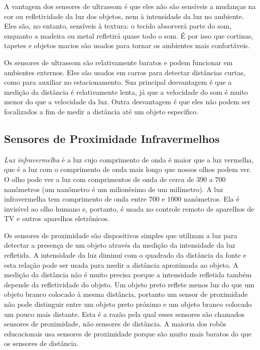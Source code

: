 A vantagem dos sensores de ultrassom é que eles não são sensíveis a mudanças na cor ou refletividade da luz dos objetos, nem à intensidade da luz no ambiente. Eles são, no entanto, sensíveis à textura: o tecido absorverá parte do som, enquanto a madeira ou metal refletirá quase todo o som. É por isso que cortinas, tapetes e objetos macios são usados para tornar os ambientes mais confortáveis.

Os sensores de ultrassom são relativamente baratos e podem funcionar em ambientes externos. Eles são usados em carros para detectar distâncias curtas, como para auxiliar no estacionamento. Sua principal desvantagem é que a medição da distância é relativamente lenta, já que a velocidade do som é muito menor do que a velocidade da luz. Outra desvantagem é que eles não podem ser focalizados a fim de medir a distância até um objeto específico.

\subsection{Sensores de Proximidade Infravermelhos}

\emph{Luz infravermelha} é a luz cujo comprimento de onda é maior que a luz vermelha, que é a luz com o comprimento de onda mais longo que nossos olhos podem ver. O olho pode ver a luz com comprimentos de onda de cerca de $390$ a $700$ nanômetros (um nanômetro é um milionésimo de um milímetro). A luz infravermelha tem comprimento de onda entre $700$ e $1000$ nanômetros. Ela é invisível ao olho humano e, portanto, é usada no controle remoto de aparelhos de TV e outros aparelhos eletrônicos.

Os sensores de proximidade são dispositivos simples que utilizam a luz para detectar a presença de um objeto através da medição da intensidade da luz refletida. A intensidade da luz diminui com o quadrado da distância da fonte e esta relação pode ser usada para medir a distância aproximada ao objeto. A medição da distância não é muito precisa porque a intensidade refletida também depende da refletividade do objeto. Um objeto preto reflete menos luz do que um objeto branco colocado à mesma distância, portanto um sensor de proximidade não pode distinguir entre um objeto preto próximo e um objeto branco colocado um pouco mais distante. Esta é a razão pela qual esses sensores são chamados sensores de proximidade, não sensores de distância. A maioria dos robôs educacionais usa sensores de proximidade porque são muito mais baratos do que os sensores de distância.

